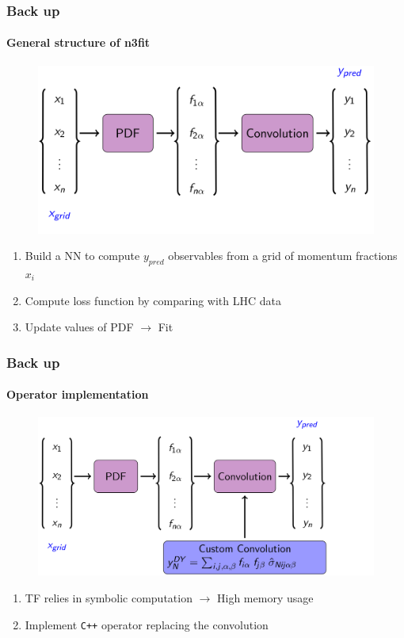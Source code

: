 \documentclass[aspectratio=43]{beamer}
\begin{document}
\begin{frame}
	
	\frametitle{Back up}
	\framesubtitle{General structure of n3fit}
	
	\footnotesize
	
	\begin{figure}
		\includegraphics[width = 9 cm]{plots/backup/n3fit1.png}
	\end{figure}	

	\begin{enumerate}
		\item Build a NN to compute $y_{pred}$ observables from a grid of momentum fractions $x_{i}$
		\item Compute loss function by comparing with LHC data
		\item Update values of PDF $\longrightarrow$ {\color{violet} Fit}
	\end{enumerate}

\end{frame}

\begin{frame}

	\frametitle{Back up}
	\framesubtitle{Operator implementation}

	\footnotesize
	
	\begin{figure}
		\includegraphics[width = 10.5 cm]{plots/backup/n3fit2.png}
	\end{figure}

	\begin{enumerate}
		\item TF relies in symbolic computation $\longrightarrow$ High memory usage
		\item Implement \texttt{C++} operator replacing the convolution
	\end{enumerate}

\end{frame}
\end{document}
